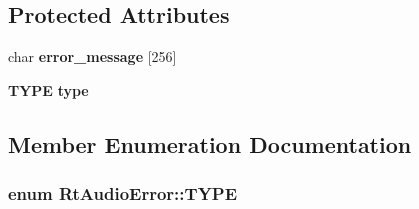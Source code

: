 \subsection*{Protected Attributes}
\begin{CompactItemize}
\item 
char {\bf error\_\-message} [256]
\item 
{\bf TYPE} {\bf type}
\end{CompactItemize}


\subsection{Member Enumeration Documentation}
\subsubsection{\setlength{\rightskip}{0pt plus 5cm}enum Rt\-Audio\-Error::TYPE}\label{classRtAudioError_s11}


